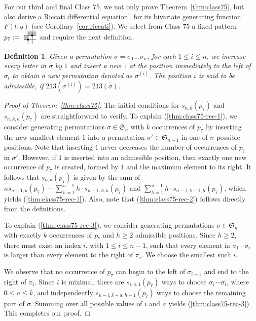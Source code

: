 \documentclass[12pt]{article}
\newtheorem{defn}[thm]{Definition}
\def\fS{\mathfrak{S}}
\newcommand{\pattern}[4]{										
	\raisebox{0.6ex}{
		\begin{tikzpicture}[scale=0.35, baseline=(current bounding box.center), #1]
		\foreach \x/\y in {#4}		\fill[gray!50] (\x,\y) rectangle +(1,1);

		\draw (0.01,0.01) grid (#2+0.99,#2+0.99);
		\foreach \x/\y in {#3}		\filldraw (\x,\y) circle (6pt);
		\end{tikzpicture}}
}
\begin{document}
For our third and final Class 75, we not only prove Theorem~\ref{thm:class75}, but also derive a Riccati differential equation~\cite{Rei1972} for its bivariate generating function $F(t,q)$ (see Corollary~\ref{cor:riccati}). We select from Class 75 a fixed pattern $p_7:=\pattern{scale=0.6}{2}{1/1,2/2}{0/1,1/2,2/2}$ and require the next definition.

\begin{defn}\label{def:admissible pos}
Given a permutation $\sigma=\sigma_1\ldots\sigma_n$, for each $1\le i\le n$, we increase every letter in $\sigma$ by $1$ and insert a new $1$ at the position immediately to the left of $\sigma_i$ to obtain a new permutation denoted as $\sigma^{(i)}$. The position $i$ is said to be \emph{admissible}, if $213(\sigma^{(i)})=213(\sigma)$.
\end{defn}








\begin{proof}[Proof of Theorem~\ref{thm:class75}]
The initial conditions for $s_{n,k}(p_7)$ and $s_{n,k,h}(p_7)$ are straightforward to verify. To explain (\ref{thm:class75-rec-1}), we consider generating permutations $\sigma \in \fS_n$ with $k$ occurrences of $p_7$ by inserting the new smallest element $1$ into a permutation $\sigma'\in \fS_{n-1}$ in one of $n$ possible positions. Note that inserting $1$ never decreases the number of occurrences of $p_7$ in $\sigma'$. However, if $1$ is inserted into an admissible position, then exactly one new occurrence of $p_7$ is created, formed by $1$ and the maximum element to its right. It follows that $s_{n,k}(p_7)$ is given by the sum of $n s_{n-1,k}(p_7)-\sum_{h=1}^{n-1} h \cdot s_{n-1,k,h}(p_7)$ and $\sum_{h=1}^{n-1} h \cdot s_{n-1,k-1,h}(p_7)$,
which yields (\ref{thm:class75-rec-1}). Also, note that (\ref{thm:class75-rec-2}) follows directly from the definitions.

To explain (\ref{thm:class75-rec-3}), we consider generating permutations $\sigma\in \fS_n$ with exactly $k$ occurrences of $p_7$ and $h\geq 2$ admissible positions. Since $h\geq 2$, there must exist an index $i$, with $1\leq i\leq n-1$, such that every element in $\sigma_1\cdots \sigma_i$ is larger than every element to the right of $\pi_i$. We choose the smallest such $i$.

We observe that no occurrence of $p_7$ can begin to the left of $\sigma_{i+1}$ and end to the right of $\pi_i$. Since $i$ is minimal, there are $s_{i,a,1}(p_7)$ ways to choose $\sigma_1\cdots\sigma_i$, where $0\leq a\leq k$, and independently $s_{n-i,k-a,h-1}(p_7)$ ways to choose the remaining part of $\sigma$. Summing over all possible values of $i$ and $a$ yields (\ref{thm:class75-rec-3}). This completes our proof. 
\end{proof}
\end{document}
